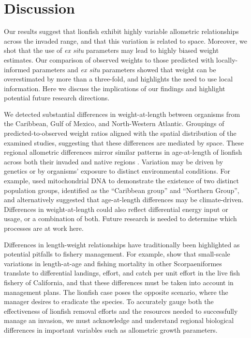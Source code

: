 \documentclass[fleqn,10pt,lineno]{wlpeerj} %
\begin{document}
\clearpage

\section*{Discussion}

Our results suggest that lionfish exhibit highly variable allometric
relationships across the invaded range, and that this variation is
related to space. Moreover, we shot that the use of \emph{ex situ}
parameters may lead to highly biased weight estimates. Our comparison of
observed weights to those predicted with locally-informed parameters and
\emph{ex situ} parameters showed that weight can be overestimated by
more than a three-fold, and highlights the need to use local
information. Here we discuss the implications of our findings and
highlight potential future research directions.

We detected substantial differences in weight-at-length between
organisms from the Caribbean, Gulf of Mexico, and North-Western
Atlantic. Groupings of predicted-to-observed weight ratios aligned with
the spatial distribution of the examined studies, suggesting that these
differences are mediated by space. These regional allometric differences
mirror similar patterns in age-at-length of lionfish across both their
invaded and native regions \citep{pusack_2016}. Variation may be driven
by genetics or by organisms' exposure to distinct environmental
conditions. For example, \citet{betancurr_2011} used mitochondrial DNA
to demonstrate the existence of two distinct population groups,
identified as the ``Caribbean group'' and ``Northern Group'', and
\citet{fogg_2015} alternatively suggested that age-at-length differences
may be climate-driven. Differences in weight-at-length could also
reflect differential energy input or usage, or a combination of both.
Future research is needed to determine which processes are at work here.

Differences in length-weight relationships have traditionally been
highlighted as potential pitfalls to fishery management. For example,
\citet{wilson_2012} show that small-scale variations in length-at-age
and fishing mortality in other Scorpaeniformes translate to differential
landings, effort, and catch per unit effort in the live fish fishery of
California, and that these differences must be taken into account in
management plans. The lionfish case poses the opposite scenario, where
the manager desires to eradicate the species. To accurately gauge both
the effectiveness of lionfish removal efforts and the resources needed
to successfully manage an invasion, we must acknowledge and understand
regional biological differences in important variables such as
allometric growth parameters.
\end{document}
